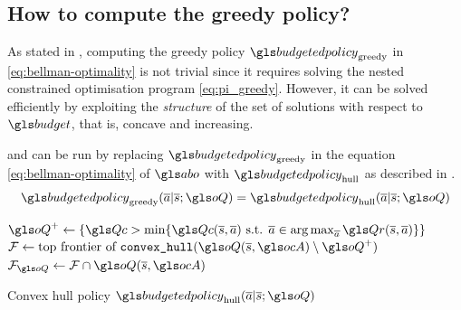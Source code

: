 \subsection{How to compute the greedy policy?}
\label{subsec:compute-greedy-policy}
As stated in , computing the greedy policy $\budgetedpolicy_\text{greedy}$ in \eqref{eq:bellman-optimality} is not trivial since it requires solving the nested constrained optimisation program \eqref{eq:pi_greedy}.
However, it can be solved efficiently by exploiting the \emph{structure} of the set of solutions with respect to $\budget$, that is, concave and increasing.

\begin{proposition}
	\begin{leftbar}[propositionbar]
	\label{prop:bftq_pi_hull}
	 and  can be run by replacing $\budgetedpolicy_\text{greedy}$ in the equation \eqref{eq:bellman-optimality} of $\abo$ with $\budgetedpolicy_\text{hull}$ as described in .
    \begin{equation*}
        \budgetedpolicy_\text{greedy}(\oa|\os; \oQ) = \budgetedpolicy_\text{hull}(\oa|\os; \oQ)
    \end{equation*}
    \end{leftbar}
\end{proposition}

\begin{algorithm}[th]
	\DontPrintSemicolon
    $\oQ^+\leftarrow \{\Qc > \min \{\Qc(\os,\oa) \text{ s.t. }\oa\in\argmax_{\oa} \Qr(\os,\oa)\} \}$\;
    $\cF \leftarrow \text{top frontier of }\texttt{convex\_hull}(\oQ(\os,\ocA) \setminus \oQ^+)$\;
    $\cF_{\oQ} \leftarrow \cF\cap \oQ(\os,\ocA)$\;
    \caption{Convex hull policy $\budgetedpolicy_\text{hull}(\oa|\os; \oQ)$}
    \label{algo:pi_hull}
\end{algorithm}

